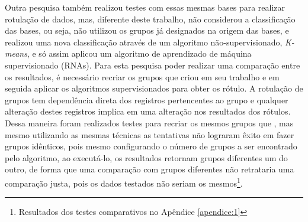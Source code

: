 Outra pesquisa também realizou testes com essas mesmas bases para realizar rotulação de dados, mas, diferente deste trabalho,  não considerou a classificação das bases, ou seja,  não utilizou os grupos já designados na origem das bases, e realizou  uma nova classificação através de um algoritmo não-supervisionado,\textit{ K-means}, e só assim aplicou um algoritmo de aprendizado  de máquina supervisionado (RNAs). Para esta pesquisa poder realizar uma comparação entre os resultados, é necessário recriar os grupos que  criou em seu trabalho e em seguida aplicar os algoritmos supervisionados para obter os rótulo. A rotulação de grupos tem dependência direta dos registros pertencentes ao grupo e qualquer alteração destes registros implica em uma alteração nos resultados dos rótulos. Dessa maneira foram realizados testes para recriar os mesmos grupos que , mas mesmo utilizando as mesmas técnicas as tentativas não lograram êxito em fazer grupos idênticos, pois mesmo configurando o número de grupos a ser encontrado pelo algoritmo, ao executá-lo, os resultados retornam grupos diferentes um do outro, de forma que uma comparação com grupos diferentes não retrataria uma comparação justa, pois os dados testados não seriam os mesmos\footnote{Resultados dos testes comparativos no Apêndice \ref{apendice:1}}.






